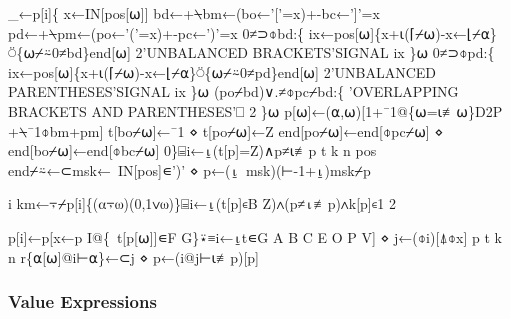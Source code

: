 \documentclass{article}%
\begin{document}
\nwenddocs{}\endmoddef\nwstartdeflinemarkup{}\nwenddeflinemarkup
_←p[i]\{
        x←IN[pos[⍵]]
        bd←+⍀bm←(bo←'['=x)+-bc←']'=x
        pd←+⍀pm←(po←'('=x)+-pc←')'=x
        0≠⊃⌽bd:\{
                ix←pos[⍵]\{x+⍳(⌈⌿⍵)-x←⌊⌿⍺\}⍥\{⍵⌿⍨0≠bd\}end[⍵]
                2'UNBALANCED BRACKETS'SIGNAL ix
        \}⍵
        0≠⊃⌽pd:\{
                ix←pos[⍵]\{x+⍳(⌈⌿⍵)-x←⌊⌿⍺\}⍥\{⍵⌿⍨0≠pd\}end[⍵]
                2'UNBALANCED PARENTHESES'SIGNAL ix
        \}⍵
        (po⌿bd)∨.≠⌽pc⌿bd:\{
                'OVERLAPPING BRACKETS AND PARENTHESES'⎕ 2
        \}⍵
        p[⍵]←(⍺,⍵)[1+¯1@\{⍵=⍳≢⍵\}D2P +⍀¯1⌽bm+pm]
        t[bo⌿⍵]←¯1 ⋄ t[po⌿⍵]←Z
        end[po⌿⍵]←end[⌽pc⌿⍵] ⋄ end[bo⌿⍵]←end[⌽bc⌿⍵]
0\}⌸i←⍸(t[p]=Z)∧p≠⍳≢p
t k n pos end⌿⍨←⊂msk←~IN[pos]∊')' ⋄ p←(⍸~msk)(⊢-1+⍸)msk⌿p
\nwendcode{}\nwdocspar

\nwenddocs{}\endmoddef\nwstartdeflinemarkup{}\nwenddeflinemarkup
i km←⍪⌿p[i]\{(⍺⍪⍵)(0,1∨⍵)\}⌸i←⍸(t[p]∊B Z)∧(p≠⍳≢p)∧k[p]∊1 2
\nwendcode{}\nwdocspar

\nwenddocs{}\endmoddef\nwstartdeflinemarkup{}\nwenddeflinemarkup
p[i]←p[x←p I@\{~t[p[⍵]]∊F G\}⍣≡i←⍸t∊G A B C E O P V] ⋄ j←(⌽i)[⍋⌽x]
p t k n r\{⍺[⍵]@i⊢⍺\}←⊂j ⋄ p←(i@j⊢⍳≢p)[p]
\nwendcode{}\nwdocspar

\subsubsection{Value Expressions}
\end{document}
